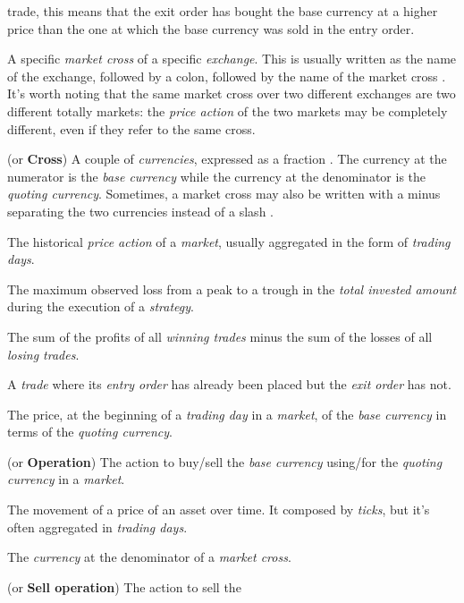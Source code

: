 \begin{description}
{		trade}, this means that the exit order has bought the base
		currency at a higher price than the one at which the base
		currency was sold in the entry order.
	\item[Market] A specific \textit{market cross} of a specific
		\textit{exchange}. This is usually written as the name of the
		exchange, followed by a colon, followed by the name of the
		market cross . It's worth noting that
		the same market cross over two different exchanges are two
		different totally markets: the \textit{price action} of the two
		markets may be completely different, even if they refer to the
		same cross.
	\item[Market cross] (or \textbf{Cross}) A couple of \textit{currencies},
		expressed as a fraction .  The
		currency at the numerator is the \textit{base currency} while
		the currency at the denominator is the \textit{quoting
		currency}. Sometimes, a market cross may also be written with a
		minus separating the two currencies instead of a slash
		.
	\item[Market data] The historical \textit{price action} of a
		\textit{market}, usually aggregated in the form of
		\textit{trading days}.
	\item[Maximum drawdown] The maximum observed loss from a peak to a
		trough in the \textit{total invested amount} during the
		execution of a \textit{strategy}.
	\item[Net profit] The sum of the profits of all \textit{winning trades}
		minus the sum of the losses of all \textit{losing trades}.
	\item[Open trade] A \textit{trade} where its \textit{entry order} has
		already been placed but the \textit{exit order} has not.
	\item[Opening price] The price, at the beginning of a \textit{trading
		day} in a \textit{market}, of the \textit{base currency} in
		terms of the \textit{quoting currency}.
	\item[Order] (or \textbf{Operation}) The action to buy/sell the
		\textit{base currency} using/for the \textit{quoting currency}
		in a \textit{market}.
	\item[Price action] The movement of a price of an asset over time. It
		composed by \textit{ticks}, but it's often aggregated in
		\textit{trading days}.
	\item[Quoting currency] The \textit{currency} at the denominator of a
		\textit{market cross}.
	\item[Sell order] (or \textbf{Sell operation}) The action to sell the

\end{description}
